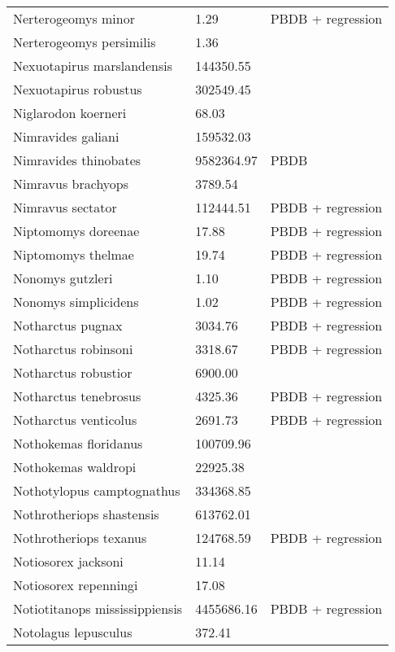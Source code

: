 \documentclass{article}
\begin{document}
\begin{center}
\begin{longtable}{p{} p{} p{}}
    Nerterogeomys minor & 1.29 & PBDB + regression \\ 
    Nerterogeomys persimilis & 1.36 & \cite{Grohe2010} \\ 
    Nexuotapirus marslandensis & 144350.55 & \cite{Tomiya2013} \\ 
    Nexuotapirus robustus & 302549.45 & \cite{Tomiya2013} \\ 
    Niglarodon koerneri & 68.03 & \cite{Tomiya2013} \\ 
    Nimravides galiani & 159532.03 & \cite{Tomiya2013} \\ 
    Nimravides thinobates & 9582364.97 & PBDB \\ 
    Nimravus brachyops & 3789.54 & \cite{Tomiya2013} \\ 
    Nimravus sectator & 112444.51 & PBDB + regression \\ 
    Niptomomys doreenae & 17.88 & PBDB + regression \\ 
    Niptomomys thelmae & 19.74 & PBDB + regression \\ 
    Nonomys gutzleri & 1.10 & PBDB + regression \\ 
    Nonomys simplicidens & 1.02 & PBDB + regression \\ 
    Notharctus pugnax & 3034.76 & PBDB + regression \\ 
    Notharctus robinsoni & 3318.67 & PBDB + regression \\ 
    Notharctus robustior & 6900.00 & \cite{Soligo2006} \\ 
    Notharctus tenebrosus & 4325.36 & PBDB + regression \\ 
    Notharctus venticolus & 2691.73 & PBDB + regression \\ 
    Nothokemas floridanus & 100709.96 & \cite{Tomiya2013} \\ 
    Nothokemas waldropi & 22925.38 & \cite{Tomiya2013} \\ 
    Nothotylopus camptognathus & 334368.85 & \cite{Tomiya2013} \\ 
    Nothrotheriops shastensis & 613762.01 & \cite{Brook2004a} \\ 
    Nothrotheriops texanus & 124768.59 & PBDB + regression \\ 
    Notiosorex jacksoni & 11.14 & \cite{Madden1985} \\ 
    Notiosorex repenningi & 17.08 & \cite{Lillegraven1977} \\ 
    Notiotitanops mississippiensis & 4455686.16 & PBDB + regression \\ 
    Notolagus lepusculus & 372.41 & \cite{Tomiya2013} \\ 

\end{longtable}
\end{center}
\end{document}
